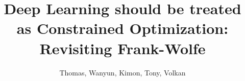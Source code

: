 \documentclass[letterpaper,10pt]{article}
\title{Deep Learning should be treated as Constrained Optimization: \\ Revisiting Frank-Wolfe}
\author{Thomas, Wanyun, Kimon, Tony, Volkan}
\begin{document}
\maketitle

\begin{abstract}

\end{abstract}


\end{document}
